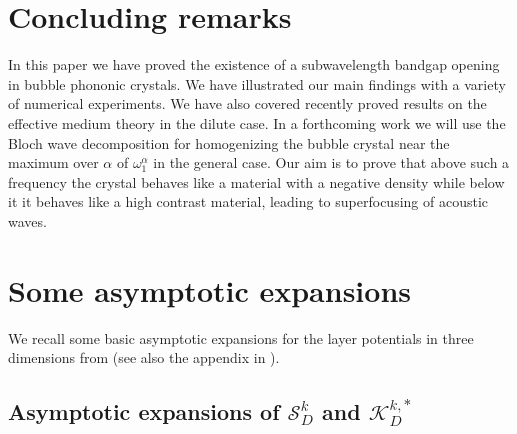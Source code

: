 \documentclass[11pt]{article}
\numberwithin{equation}{section}
\newcommand\1{{\ensuremath {\mathds 1} }}
\begin{document}
{{\section{Concluding remarks}
In this paper we have proved the existence of a subwavelength bandgap opening in bubble phononic crystals. We have illustrated our main findings with a variety of numerical experiments. We have also covered recently proved results on the effective medium theory in the dilute case. In a forthcoming work we will use the Bloch wave decomposition for homogenizing \cite{bloch, Lipton2} the bubble crystal near the maximum over $\alpha$ of $\omega_1^\alpha$ in the general case. Our aim is to prove that above such a frequency the crystal behaves like a material with a negative density while below it it behaves like a high contrast material, leading to superfocusing of acoustic waves.  

\appendix
\section{Some asymptotic expansions} \label{sec-appendix-1}

We recall some basic asymptotic expansions for the layer potentials in three dimensions from \cite{Ammari2009_book} (see also the appendix in \cite{Ammari2015_c}). 


\subsection{Asymptotic expansions of $\mathcal{S}_{D}^{k}$ and $\mathcal{K}_{D}^{k, *}$}

}}
\end{document}
